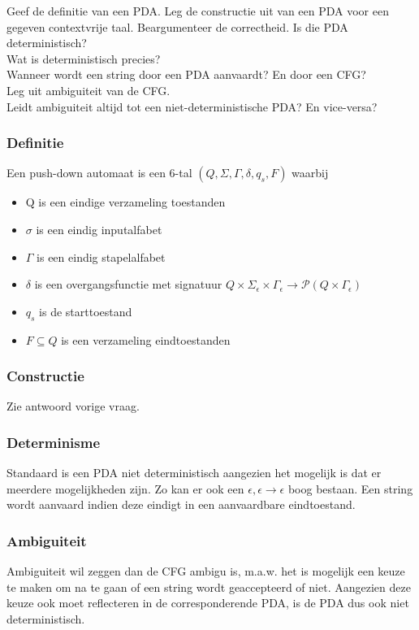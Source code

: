 \begin{question}
  Geef de definitie van een PDA. Leg de constructie uit van een PDA voor een gegeven contextvrije taal. Beargumenteer de correctheid.
  Is die PDA deterministisch?\\
  Wat is deterministisch precies?\\
  Wanneer wordt een string door een PDA aanvaardt? En door een CFG?\\
  Leg uit ambiguiteit van de CFG.\\
  Leidt ambiguiteit altijd tot een niet-deterministische PDA? En vice-versa?
\end{question}

\subsubsection*{Definitie}

\begin{theorem}
  Een push-down automaat is een 6-tal $(Q,\Sigma, \Gamma, \delta, q_s, F)$ waarbij
  \begin{itemize}
    \item Q is een eindige verzameling toestanden
    \item $\sigma$ is een eindig inputalfabet
    \item $\Gamma$ is een eindig stapelalfabet
    \item $\delta$ is een overgangsfunctie met signatuur $Q \times \Sigma_\epsilon \times \Gamma_\epsilon \rightarrow \mathcal{P}(Q \times \Gamma_\epsilon)$
    \item $q_s$ is de starttoestand
    \item $F \subseteq Q$ is een verzameling eindtoestanden
  \end{itemize}
\end{theorem}

\subsubsection*{Constructie}

Zie antwoord vorige vraag.

\subsubsection*{Determinisme}

Standaard is een PDA niet deterministisch aangezien het mogelijk is dat er meerdere mogelijkheden zijn. Zo kan er ook een $\epsilon, \epsilon \rightarrow \epsilon$ boog bestaan. Een string wordt aanvaard indien deze eindigt in een aanvaardbare eindtoestand.

\subsubsection*{Ambiguiteit}

Ambiguiteit wil zeggen dan de CFG ambigu is, m.a.w. het is mogelijk een keuze te maken om na te gaan of een string wordt geaccepteerd of niet. Aangezien deze keuze ook moet reflecteren in de corresponderende PDA, is de PDA dus ook niet deterministisch.

